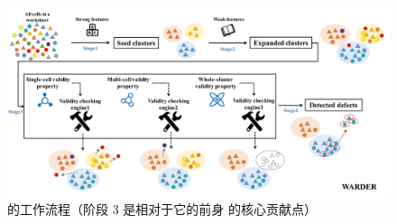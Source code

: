 \begin{figure}[tbp]    
    \centering
    \includegraphics[width=1\textwidth]{figure/figure1.pdf}
    \caption{\wa 的工作流程（阶段 3 是相对于它的前身 \cu 的核心贡献点）}
    \label{figure1}
\end{figure}